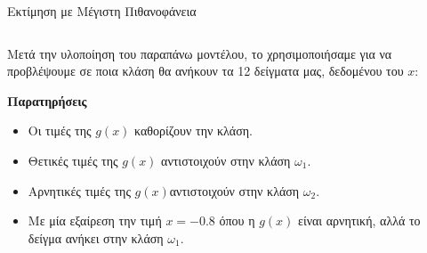 \documentclass{beamer}
\begin{document}
\begin{frame}{Εκτίμηση με Μέγιστη Πιθανοφάνεια}
    \begin{columns} %
        \begin{column}{0.6\textwidth}

            Μετά την υλοποίηση του παραπάνω μοντέλου, το χρησιμοποιήσαμε για να προβλέψουμε σε ποια κλάση θα ανήκουν 
            τα 12 δείγματα μας, δεδομένου του $x$:


        
            \textbf{Παρατηρήσεις}
            \begin{itemize}
                \item Οι τιμές της \( g(x) \) καθορίζουν την κλάση.
                \item Θετικές τιμές της \( g(x) \) αντιστοιχούν στην κλάση \( \omega_1 \).
                \item Αρνητικές τιμές της \( g(x) \)αντιστοιχούν στην κλάση \( \omega_2 \).
                \item Με μία εξαίρεση την τιμή $x=-0.8$ όπου η $g(x)$ είναι αρνητική, αλλά το 
                δείγμα ανήκει στην κλάση \( \omega_1 \).
            \end{itemize}
            
        \end{column}

        \begin{column}{0.4\textwidth}
            \centering
        \end{column}
    \end{columns}
\end{frame}
\end{document}
